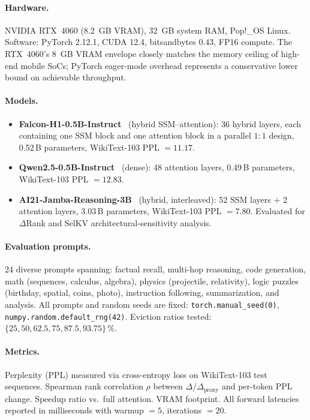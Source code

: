 \documentclass[11pt]{article}
\newcommand{\dsig}{\Delta}
\newcommand{\proxydsig}{\ensuremath{\dsig_{\mathrm{proxy}}}}
\begin{document}
\paragraph{Hardware.} NVIDIA RTX~4060 (8.2~GB VRAM), 32~GB system RAM,
Pop!\_OS Linux. Software: PyTorch 2.12.1, CUDA 12.4, bitsandbytes 0.43,
FP16 compute. The RTX~4060's 8~GB VRAM envelope closely matches the memory
ceiling of high-end mobile SoCs; PyTorch eager-mode overhead represents a
conservative lower bound on achievable throughput.

\paragraph{Models.}
\begin{itemize}[leftmargin=1.4em,itemsep=1pt,topsep=1pt]
  \item \textbf{Falcon-H1-0.5B-Instruct}~\cite{falconh1} (hybrid
    SSM--attention): 36 hybrid layers, each containing one SSM block and one
    attention block in a parallel $1{:}1$ design, 0.52\,B parameters,
    WikiText-103 PPL $=11.17$.
  \item \textbf{Qwen2.5-0.5B-Instruct}~\cite{qwen25} (dense): 48 attention
    layers, 0.49\,B parameters, WikiText-103 PPL $=12.83$.
  \item \textbf{AI21-Jamba-Reasoning-3B}~\cite{jamba} (hybrid, interleaved):
    52 SSM layers $+$ 2 attention layers, 3.03\,B parameters, WikiText-103
    PPL $=7.80$. Evaluated for $\dsig$Rank and SelKV
    architectural-sensitivity analysis.
\end{itemize}

\paragraph{Evaluation prompts.}
24 diverse prompts spanning: factual recall, multi-hop reasoning, code
generation, math (sequences, calculus, algebra), physics (projectile,
relativity), logic puzzles (birthday, spatial, coins, photo), instruction
following, summarization, and analysis. All prompts and random seeds are
fixed: \texttt{torch.manual\_seed(0)}, \texttt{numpy.random.default\_rng(42)}.
Eviction ratios tested: $\{25, 50, 62.5, 75, 87.5, 93.75\}\,\%$.

\paragraph{Metrics.} Perplexity (PPL) measured via cross-entropy loss on
WikiText-103 test sequences. Spearman rank correlation $\rho$ between
$\dsig$/$\proxydsig$ and per-token PPL change. Speedup ratio vs.\ full
attention. VRAM footprint. All forward latencies reported in milliseconds
with warmup $=5$, iterations $=20$.
\end{document}
